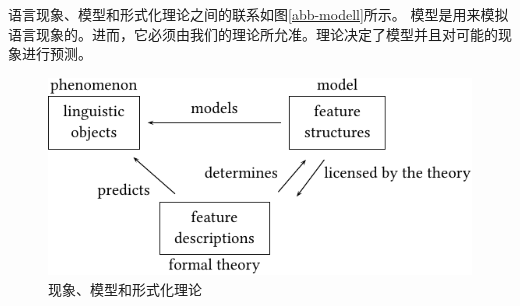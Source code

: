 语言现象、模型和形式化理论之间的联系如图\vref{abb-modell}所示。
模型是用来模拟语言现象的。进而，它必须由我们的理论所允准。理论决定了模型并且对可能的现象进行预测。
\begin{figure}
\centerline{%
\includegraphics{Figures/model-theory-phenomenon-crop}
}
\caption{\label{abb-modell}现象、模型和形式化理论}
\end{figure}%
\nocite{Netter98a}%

